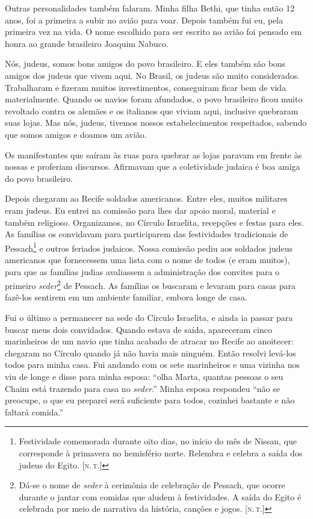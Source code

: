 Outras personalidades também falaram. Minha filha Bethi, que tinha
então 12 anos, foi a primeira a subir no avião para voar. Depois também fui eu, pela primeira vez na vida. O nome escolhido para ser escrito no avião foi pensado em honra ao grande brasileiro Joaquim Nabuco.

Nós, judeus, somos bons amigos do povo brasileiro. E eles também são bons
amigos dos judeus que vivem aqui. No Brasil, os judeus são muito
considerados. Trabalharam e fizeram muitos investimentos, conseguiram ficar bem de vida materialmente. Quando os navios foram afundados, o povo brasileiro ficou muito revoltado contra os alemães e
os italianos que viviam aqui, inclusive quebraram suas lojas. Mas nós, judeus,
tivemos nossos estabelecimentos respeitados, sabendo que somos amigos e
doamos um avião.

Os manifestantes que saíram às ruas para quebrar as lojas paravam em
frente às nossas e proferiam discursos. Afirmavam que a
coletividade judaica é boa amiga do povo brasileiro.

Depois chegaram ao Recife soldados americanos. Entre eles, muitos
militares eram judeus. Eu entrei na comissão para lhes dar apoio moral,
material e também religioso. Organizamos, no Círculo Israelita,
recepções e festas para eles. As famílias os convidavam para
participarem das festividades tradicionais de Pessach\footnote{Festividade
  comemorada durante oito dias, no início do mês de Nissan, que
  corresponde à primavera no hemisfério norte. Relembra e celebra a
  saída dos judeus do Egito. {[}\textsc{n.\,t.}{]}} e outros feriados judaicos. Nossa comissão
pediu aos soldados judeus americanos que fornecessem uma lista com o
nome de todos (e eram muitos), para que as famílias
judias avaliassem a administração dos convites para o primeiro
\textit{seder}\footnote{Dá-se o nome de \textit{seder} à cerimônia de celebração de
  Pessach, que ocorre durante o jantar com comidas que aludem à festividades. A saída do Egito é celebrada por meio de narrativa da história, canções e jogos. {[}\textsc{n.\,t.}{]}} de Pessach. As famílias os buscaram e levaram para casas para fazê-los sentirem em um ambiente familiar, embora longe de casa.

Fui o último a permanecer na sede do Círculo Israelita, e ainda ia passar
para buscar meus dois convidados. Quando
estava de saída, apareceram cinco marinheiros de um navio que tinha
acabado de atracar no Recife ao anoitecer: chegaram no Círculo quando
já não havia mais ninguém. Então resolvi levá-los todos para minha casa.
Fui andando com os sete marinheiros e uma vizinha nos viu de longe e
disse para minha esposa: ``olha Marta, quantas pessoas o seu Chaim está
trazendo para casa no \textit{seder}.'' Minha esposa respondeu ``não se
preocupe, o que eu preparei será suficiente para todos, cozinhei
bastante e não faltará comida.'' 

